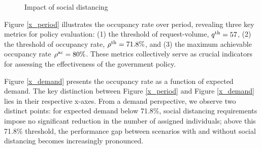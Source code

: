\begin{figure}[h]
  \centering
      \caption{Impact of social distancing}\label{occupancy_rate_demand}
\end{figure}

Figure \ref{x_period} illustrates the occupancy rate over period, revealing three key metrics for policy evaluation: (1) the threshold of request-volume, ${q}^{\textup{th}} = 57$, (2) the threshold of occupancy rate, $\rho^{\textup{th}} = 71.8\%$, and (3) the maximum achievable occupancy rate $\rho^{\textup{ac}} =80\%$. These metrics collectively serve as crucial indicators for assessing the effectiveness of the government policy.





Figure \ref{x_demand} presents the occupancy rate as a function of expected demand. The key distinction between Figure \ref{x_period} and Figure \ref{x_demand} lies in their respective x-axes. From a demand perspective, we observe two distinct points: for expected demand below 71.8\%, social distancing requirements impose no significant reduction in the number of assigned individuals; above this 71.8\% threshold, the performance gap between scenarios with and without social distancing becomes increasingly pronounced.

